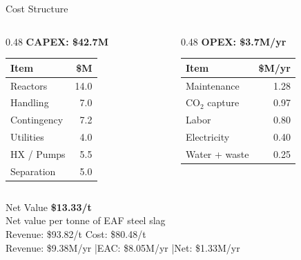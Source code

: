 \documentclass[aspectratio=169]{beamer}
\begin{document}
\begin{frame}{Cost Structure}
\begin{columns}[T]
\begin{column}{0.48\textwidth}
\textbf{CAPEX: \$42.7M}
\begin{tabular}{@{}lr@{}}
\toprule
\textbf{Item} & \textbf{\$M} \\
\midrule
Reactors      & 14.0 \\
Handling      & 7.0 \\
Contingency   & 7.2 \\
Utilities     & 4.0 \\
HX / Pumps    & 5.5 \\
Separation    & 5.0 \\
\bottomrule
\end{tabular}
\end{column}
\begin{column}{0.48\textwidth}
\textbf{OPEX: \$3.7M/yr}
\begin{tabular}{@{}lr@{}}
\toprule
\textbf{Item} & \textbf{\$M/yr} \\
\midrule
Maintenance   & 1.28 \\
CO$_2$ capture & 0.97 \\
Labor         & 0.80 \\
Electricity   & 0.40 \\
Water + waste & 0.25 \\
\bottomrule
\end{tabular}
\end{column}
\end{columns}
\end{frame}

\begin{frame}{Net Value}
\centering
\vspace{1.5cm}
{\Huge\textbf{\textcolor{StepGreen}{\$13.33/t}}}\\[12pt]
{\large Net value per tonne of EAF steel slag}\\[10pt]
{\normalsize
\textcolor{StepGreen}{Revenue: \$93.82/t} \quad
\textcolor{StepRed}{Cost: \$80.48/t}}\\[16pt]
{\small
Revenue: \$9.38M/yr \quad|\quad EAC: \$8.05M/yr \quad|\quad Net: \$1.33M/yr}
\end{frame}
\end{document}
